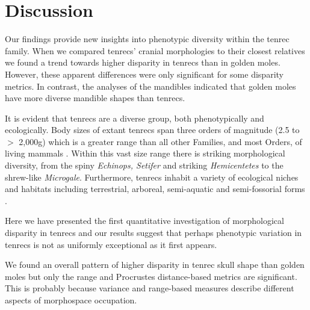 \documentclass[12pt,a4paper]{article}
\begin{document}
\section{Discussion} 

	Our findings provide new insights into phenotypic diversity within the tenrec family. 
	When we compared tenrecs' cranial morphologies to their closest relatives we found a trend towards higher disparity in tenrecs than in golden moles. However, these apparent differences were only significant for some disparity metrics. In contrast, the analyses of the mandibles indicated that golden moles have more diverse mandible shapes than tenrecs.



	It is evident that tenrecs are a diverse group, both phenotypically and ecologically. Body sizes of extant tenrecs span three orders of magnitude (2.5 to $>$ 2,000g) which is a greater range than all other Families, and most Orders, of living mammals \citep{Olson2003}. Within this vast size range there is striking morphological diversity, from the spiny \textit{Echinops, Setifer} and striking \textit{Hemicentetes} to the shrew-like  \textit{Microgale}. Furthermore, tenrecs inhabit a variety of ecological niches and habitats including terrestrial, arboreal, semi-aquatic and semi-fossorial forms \citep{Soarimalala2011}. 
	
	Here we have presented the first quantitative investigation of morphological disparity in tenrecs and our results suggest that perhaps phenotypic variation in tenrecs is not as uniformly exceptional as it first appears.





	We found an overall pattern of higher disparity in tenrec skull shape than golden moles but only the range and Procrustes distance-based metrics are significant. This is probably because variance and range-based measures describe different aspects of morphospace occupation. 
\end{document}
